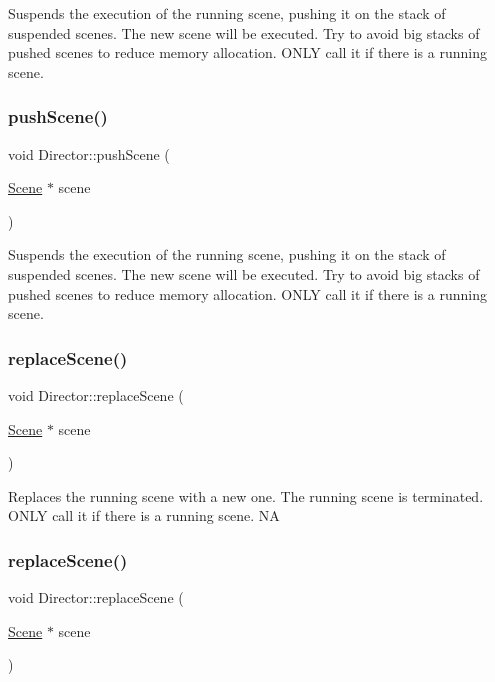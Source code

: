 Suspends the execution of the running scene, pushing it on the stack of suspended scenes. The new scene will be executed. Try to avoid big stacks of pushed scenes to reduce memory allocation. O\+N\+LY call it if there is a running scene. \mbox{\label{classDirector_ad113f1a2b5ab297788caa791b57f458b}} 
\subsubsection{\texorpdfstring{push\+Scene()}{pushScene()}\hspace{0.1cm}{\footnotesize\ttfamily [2/2]}}
{\footnotesize\ttfamily void Director\+::push\+Scene (\begin{DoxyParamCaption}\item[{\hyperlink{classScene}{Scene} $\ast$}]{scene }\end{DoxyParamCaption})}

Suspends the execution of the running scene, pushing it on the stack of suspended scenes. The new scene will be executed. Try to avoid big stacks of pushed scenes to reduce memory allocation. O\+N\+LY call it if there is a running scene. \mbox{\label{classDirector_a75d57e62351449bb5a4ed2cd7412fb25}} 
\subsubsection{\texorpdfstring{replace\+Scene()}{replaceScene()}\hspace{0.1cm}{\footnotesize\ttfamily [1/2]}}
{\footnotesize\ttfamily void Director\+::replace\+Scene (\begin{DoxyParamCaption}\item[{\hyperlink{classScene}{Scene} $\ast$}]{scene }\end{DoxyParamCaption})}

Replaces the running scene with a new one. The running scene is terminated. O\+N\+LY call it if there is a running scene.  NA \mbox{\label{classDirector_a75d57e62351449bb5a4ed2cd7412fb25}} 
\subsubsection{\texorpdfstring{replace\+Scene()}{replaceScene()}\hspace{0.1cm}{\footnotesize\ttfamily [2/2]}}
{\footnotesize\ttfamily void Director\+::replace\+Scene (\begin{DoxyParamCaption}\item[{\hyperlink{classScene}{Scene} $\ast$}]{scene }\end{DoxyParamCaption})}

